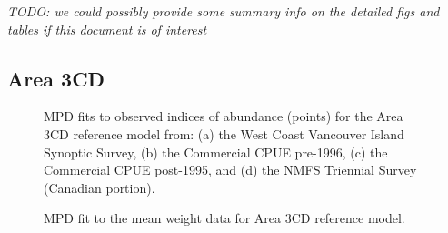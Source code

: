 \documentclass[11pt]{book}
\begin{document}
\emph{TODO: we could possibly provide some summary info on the detailed figs and tables if this document is of interest}

\hypertarget{area-3cd}{%
\subsection{Area 3CD}\label{area-3cd}}
\begin{figure}[htb]

{\centering {} 

}

\caption{MPD fits to observed indices of abundance (points) for the Area 3CD reference model from: (a) the West Coast Vancouver Island Synoptic Survey, (b) the Commercial CPUE pre-1996, (c) the Commercial CPUE post-1995, and (d) the NMFS Triennial Survey (Canadian portion).}\label{fig:summary-fig-base-index-fits-3cd}
\end{figure}
\begin{figure}[htb]

{\centering {} 

}

\caption{MPD fit to the mean weight data for Area 3CD reference model.}\label{fig:summary-fig-base-mean-weight-3cd}
\end{figure}
\clearpage
\end{document}
